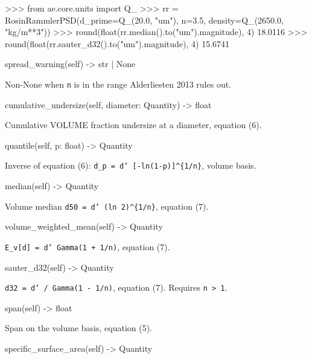 \documentclass[10pt,a4paper,twoside]{report}
\begin{document}
\begin{doctestblock}
>>> from ae.core.units import Q_
>>> rr = RosinRammlerPSD(d_prime=Q_(20.0, "um"), n=3.5, density=Q_(2650.0, "kg/m**3"))
>>> round(float(rr.median().to("um").magnitude), 4)
18.0116
>>> round(float(rr.sauter_d32().to("um").magnitude), 4)
15.6741
\end{doctestblock}

\begin{verbatimsmall}
spread_warning(self) -> str | None
\end{verbatimsmall}

Non-None when \texttt{n} is in the range Alderliesten 2013 rules out.

\begin{verbatimsmall}
cumulative_undersize(self, diameter: Quantity) -> float
\end{verbatimsmall}

Cumulative VOLUME fraction undersize at a diameter, equation (6).

\begin{verbatimsmall}
quantile(self, p: float) -> Quantity
\end{verbatimsmall}

Inverse of equation (6): \texttt{d\_p = d' [-ln(1-p)]\textasciicircum{}\{1/n\}}, volume basis.

\begin{verbatimsmall}
median(self) -> Quantity
\end{verbatimsmall}

Volume median \texttt{d50 = d' (ln 2)\textasciicircum{}\{1/n\}}, equation (7).

\begin{verbatimsmall}
volume_weighted_mean(self) -> Quantity
\end{verbatimsmall}

\texttt{E\_v[d] = d' Gamma(1 + 1/n)}, equation (7).

\begin{verbatimsmall}
sauter_d32(self) -> Quantity
\end{verbatimsmall}

\texttt{d32 = d' / Gamma(1 - 1/n)}, equation (7). Requires \texttt{n > 1}.

\begin{verbatimsmall}
span(self) -> float
\end{verbatimsmall}

Span on the volume basis, equation (5).

\begin{verbatimsmall}
specific_surface_area(self) -> Quantity
\end{verbatimsmall}
\end{document}
